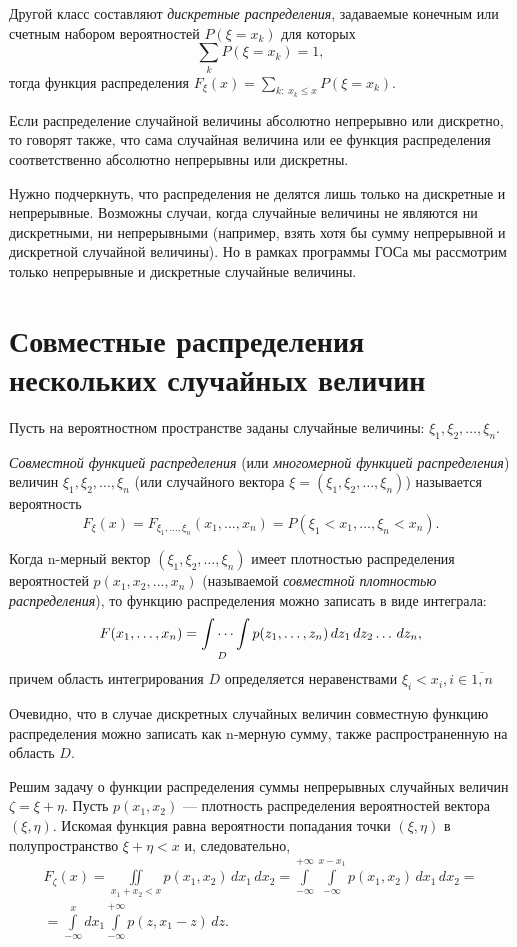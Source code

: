 Другой класс составляют \textit{дискретные распределения}, задаваемые конечным или счетным набором вероятностей $P(\xi = x_k)$ для которых
$$
\sum\limits_k P(\xi=x_k)=1,
$$
тогда функция распределения $F_\xi(x)=\sum\limits_{k:\; x_k \le x} P(\xi=x_k)$.

Если распределение случайной величины абсолютно непрерывно или дискретно, то говорят также, что сама случайная величина или ее функция распределения соответственно абсолютно непрерывны или дискретны.

Нужно подчеркнуть, что распределения не делятся лишь только на дискретные и непрерывные. Возможны случаи, когда случайные величины не являются ни дискретными, ни непрерывными (например, взять хотя бы сумму непрерывной и дискретной случайной величины). Но в рамках программы ГОСа мы рассмотрим только непрерывные и дискретные случайные величины. 

\section{Совместные распределения нескольких случайных величин}
Пусть на вероятностном пространстве заданы случайные величины: $\xi_1,\xi_2,\dots,\xi_n$.
\begin{defn}
\textit{Совместной функцией распределения} (или\textit{ многомерной функцией распределения}) величин $\xi_1,\xi_2,\dots,\xi_n$ (или случайного вектора $\xi = (\xi_1,\xi_2,\dots,\xi_n)$) называется вероятность 
$$
F_\xi(x)=F_{\xi_1,\dots,\xi_n}(x_1,\dots,x_n)=P(\xi_1 < x_1,\dots,\xi_n<x_n).
$$
\end{defn}

Когда n-мерный вектор $(\xi_1,\xi_2,\dots,\xi_n)$ имеет плотностью распределения вероятностей $p(x_1,x_2,\dots,x_n)$ (называемой \textit{совместной плотностью распределения}), то функцию распределения можно записать в виде интеграла:
$$
F(x_1,\dots,x_n)=\idotsint\limits_D p(z_1,\dots,z_n)\,dz_1\,dz_2\dots\,dz_n,
$$
причем область интегрирования $D$ определяется неравенствами $\xi_i<x_i, i\in \overline{1,n}$

Очевидно, что в случае дискретных случайных величин совместную функцию распределения можно записать как n-мерную сумму, также распространенную на область $D$.


Решим задачу о функции распределения суммы непрерывных случайных величин $\zeta=\xi+\eta$. Пусть $p(x_1,x_2)$ --- плотность распределения вероятностей вектора $(\xi,\eta)$. Искомая функция равна вероятности попадания точки $(\xi,\eta)$ в полупространство $\xi+\eta<x$ и, следовательно, 
\begin{multline}\label{ch31.1eq1}
F_{\zeta}(x)=\iint\limits_{x_1+x_2<x} p(x_1,x_2)\,dx_1\,dx_2=\int\limits_{-\infty}^{+\infty}\int\limits_{-\infty}^{x-x_1}p(x_1,x_2)\,dx_1\,dx_2=\\
=\int\limits_{-\infty}^{x}dx_1\int\limits_{-\infty}^{+\infty} p(z,x_1-z)\,dz.
\end{multline}

